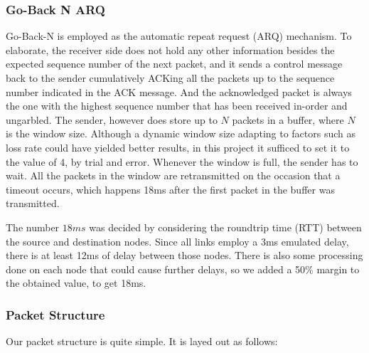 \documentclass[conference]{IEEEtran}
\begin{document}
\subsubsection{Go-Back N ARQ}
Go-Back-N is employed as the automatic repeat request (ARQ) mechanism. To elaborate, the
receiver side does not hold any other information besides the expected sequence number of the next
packet, and it sends a control message back to the sender cumulatively ACKing all the packets
up to the sequence number indicated in the ACK message. And the acknowledged packet is always
the one with the highest sequence number that has been received in-order and ungarbled. The
sender, however does store up to $N$ packets in a buffer, where $N$ is the window size. Although
a dynamic window size adapting to factors such as loss rate could have yielded better results, in this
project it sufficed to set it to the value of 4, by trial and error. Whenever the window is
full, the sender has to wait. All the packets in the window are retransmitted on the occasion that a
timeout occurs, which happens 18ms after the first packet in the buffer was transmitted.

The number $18ms$ was decided by considering the roundtrip time (RTT) between the source and
destination nodes. Since all links employ a 3ms emulated delay, there is at least 12ms of delay
between those nodes. There is also some processing done on each node that could cause further
delays, so we added a 50\% margin to the obtained value, to get 18ms.


\subsubsection{Packet Structure}

Our packet structure is quite simple. It is layed out as follows:
\end{document}
